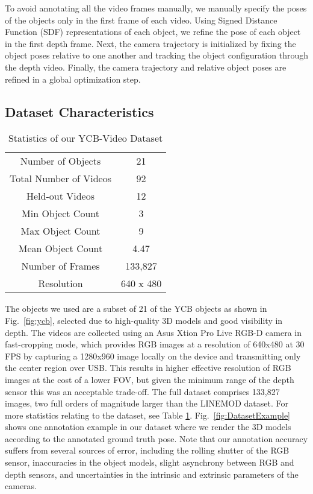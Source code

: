 \documentclass[conference]{IEEEtran}
\begin{document}
To avoid annotating all the video frames manually, we manually specify the poses of the objects only in the first frame of each video.  Using Signed Distance Function (SDF) representations of each object, we refine the pose of each object in the first depth frame. Next, the camera trajectory is initialized by fixing the object poses relative to one another and tracking the object configuration through the depth video. Finally, the camera trajectory and relative object poses are refined in a global optimization step.



\subsection{Dataset Characteristics}

\begin{table}
	\centering
	\caption{\small Statistics of our YCB-Video Dataset}
	\label{tab:DatasetStatistics}
	\begin{tabular}{ | c | c | }
		\hline			
		Number of Objects & 21 \\
		Total Number of Videos & 92 \\
		Held-out Videos & 12 \\
		Min Object Count & 3 \\
		Max Object Count & 9 \\
		Mean Object Count & 4.47 \\
		Number of Frames & 133,827 \\
		Resolution & 640 x 480 \\
		\hline
	\end{tabular}
	\vspace{-2mm}
\end{table}

The objects we used are a subset of 21 of the YCB objects \cite{calli2015ycb} as shown in Fig.~\ref{fig:ycb}, selected due to high-quality 3D models and good visibility in depth. The videos are collected using an Asus Xtion Pro Live RGB-D camera in fast-cropping mode, which provides RGB images at a resolution of 640x480 at 30 FPS by capturing a 1280x960 image locally on the device and transmitting only the center region over USB. This results in higher effective resolution of RGB images at the cost of a lower FOV, but given the minimum range of the depth sensor this was an acceptable trade-off. The full dataset comprises 133,827 images, two full orders of magnitude larger than the LINEMOD dataset. For more statistics relating to the dataset, see Table \ref{tab:DatasetStatistics}. Fig.~\ref{fig:DatasetExample} shows one annotation example in our dataset where we render the 3D models according to the annotated ground truth pose. Note that our annotation accuracy suffers from several sources of error, including the rolling shutter of the RGB sensor, inaccuracies in the object models, slight asynchrony between RGB and depth sensors, and uncertainties in the intrinsic and extrinsic parameters of the cameras.
\end{document}

